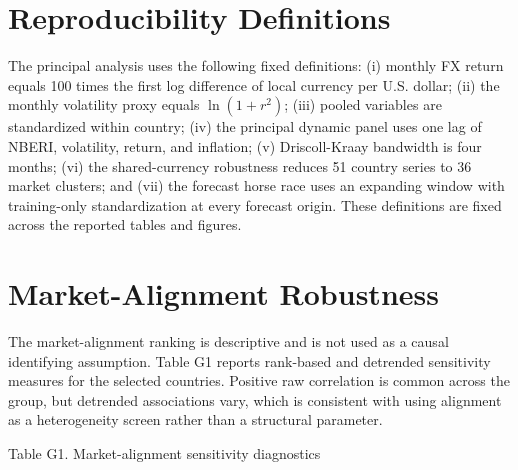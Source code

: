 \documentclass[11pt]{article}
\begin{document}
\section{Reproducibility Definitions}\label{appendix-f.-reproducibility-definitions}

The principal analysis uses the following fixed definitions: (i) monthly
FX return equals 100 times the first log difference of local currency
per U.S. dollar; (ii) the monthly volatility proxy equals \(\ln(1+r^2)\);
(iii) pooled variables are standardized within country; (iv) the
principal dynamic panel uses one lag of NBERI, volatility, return, and
inflation; (v) Driscoll-Kraay bandwidth is four months; (vi) the
shared-currency robustness reduces 51 country series to 36 market
clusters; and (vii) the forecast horse race uses an expanding window
with training-only standardization at every forecast origin. These
definitions are fixed across the reported tables and figures.

\section{Market-Alignment Robustness}\label{appendix-g.-market-alignment-robustness}

The market-alignment ranking is descriptive and is not used as a causal
identifying assumption. Table G1 reports rank-based and detrended
sensitivity measures for the selected countries. Positive raw
correlation is common across the group, but detrended associations vary,
which is consistent with using alignment as a heterogeneity
screen rather than a structural parameter.

Table G1. Market-alignment sensitivity diagnostics
\end{document}
